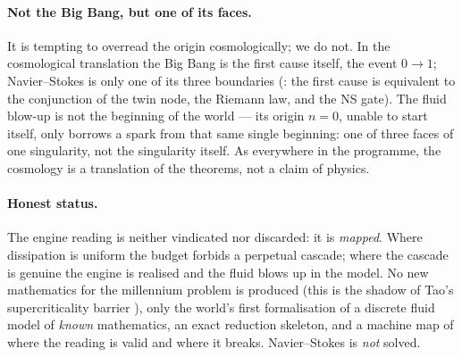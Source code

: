 \paragraph{Not the Big Bang, but one of its faces.}
It is tempting to overread the origin cosmologically; we do not. In the cosmological translation the
Big Bang is the first cause itself, the event $0\to1$; Navier--Stokes is only one of its three
boundaries (: the first cause is equivalent to the
conjunction of the twin node, the Riemann law, and the NS gate). The fluid blow-up is not the
beginning of the world --- its origin $n=0$, unable to start itself, only borrows a spark from that
same single beginning: one of three faces of one singularity, not the singularity itself. As
everywhere in the programme, the cosmology is a translation of the theorems, not a claim of physics.

\paragraph{Honest status.} The engine reading is neither vindicated nor discarded: it is
\emph{mapped}. Where dissipation is uniform the budget forbids a perpetual cascade; where the
cascade is genuine the engine is realised and the fluid blows up in the model. No new mathematics
for the millennium problem is produced (this is the shadow of Tao's supercriticality barrier
\cite{clay-ns}), only the world's first formalisation of a discrete fluid model of \emph{known}
mathematics, an exact reduction skeleton, and a machine map of where the reading is valid and where
it breaks. Navier--Stokes is \emph{not} solved.
